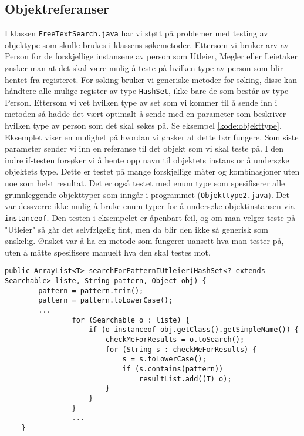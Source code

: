 \subsection{Objektreferanser}
I klassen \texttt{FreeTextSearch.java} har vi støtt på problemer med testing av objektype som skulle brukes i klassens søkemetoder. Ettersom vi bruker arv av Person for de forskjellige instansene av person som Utleier, Megler eller Leietaker ønsker man at det skal være mulig å teste på hvilken type av person som blir hentet fra registeret. For søking bruker vi generiske metoder for søking, disse kan håndtere alle mulige register av type \texttt{HashSet}, ikke bare de som består av type Person. Ettersom vi vet hvilken type av set som vi kommer til å sende inn i metoden så hadde det vært optimalt å sende med en parameter som beskriver hvilken type av person som det skal søkes på. Se eksempel \ref{kode:objekttype}. Eksemplet viser en mulighet på hvordan vi ønsker at dette bør fungere. Som siste parameter sender vi inn en referanse til det objekt som vi skal teste på. I den indre if-testen forsøker vi å hente opp navn til objektets instans or å undersøke objektets type. Dette er testet på mange forskjellige måter og kombinasjoner uten noe som helst resultat. Det er også testet med enum type som spesifiserer alle grunnleggende objekttyper som inngår i programmet (\texttt{Objekttype2.java}). Det var dessverre ikke mulig å bruke enum-typer for å undersøke objektinstansen via \texttt{instanceof}. Den testen i eksempelet er åpenbart feil, og om man velger teste på "Utleier" så går det selvfølgelig fint, men da blir den ikke så generisk som ønskelig. Ønsket var å ha en metode som fungerer uansett hva man tester på, uten å måtte spesifisere manuelt hva den skal testes mot.


\begin{lstlisting}[caption=Problem med å teste for objekttype., label=kode:objekttype]
    public ArrayList<T> searchForPatternIUtleier(HashSet<? extends Searchable> liste, String pattern, Object obj) {
        pattern = pattern.trim();
        pattern = pattern.toLowerCase();
        ...
                for (Searchable o : liste) {
                    if (o instanceof obj.getClass().getSimpleName()) {
                        checkMeForResults = o.toSearch();
                        for (String s : checkMeForResults) {
                            s = s.toLowerCase();
                            if (s.contains(pattern))
                                resultList.add((T) o);
                        }
                    }
                }     
                ...
    }
\end{lstlisting}




